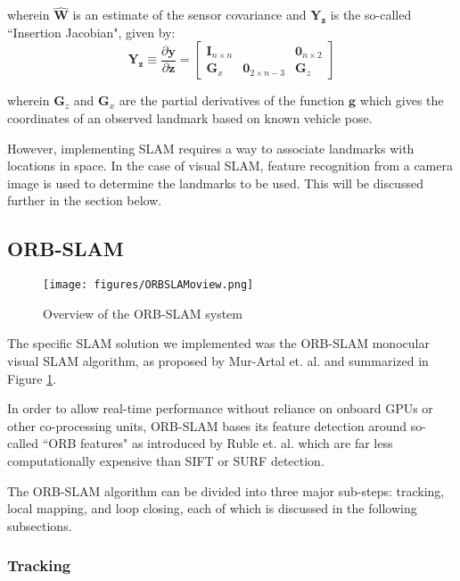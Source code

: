 wherein $\hat{\mathbf{W}}$ is an estimate of the sensor covariance and $\mathbf{Y_z}$ is the so-called ``Insertion Jacobian", given by: \begin{equation*}
    \mathbf{Y_z} \equiv \frac{\partial \mathbf{y}}{\partial \mathbf{z}} = \begin{bmatrix}
        \mathbf{I}_{n \times n} & & \mathbf{0}_{n\times 2} \\
        \mathbf{G}_x & \mathbf{0}_{2\times n-3} & \mathbf{G}_z
    \end{bmatrix}
\end{equation*}

wherein $\mathbf{G}_z$ and $\mathbf{G}_x$ are the partial derivatives of the function $\mathbf{g}$ which gives the coordinates of an observed landmark based on known vehicle pose.

However, implementing SLAM requires a way to associate landmarks with locations in space. In the case of visual SLAM, feature recognition from a camera image is used to determine the landmarks to be used. This will be discussed further in the section below.

\subsection{ORB-SLAM}

\begin{figure}[H]
    \centering
    \texttt{[image: figures/ORBSLAMoview.png]}
    \caption{Overview of the ORB-SLAM system \cite{ORBSLAM}}
    \label{fig:OSLAMOview}
\end{figure}

The specific SLAM solution we implemented was the ORB-SLAM monocular visual SLAM algorithm, as proposed by Mur-Artal et. al. \cite{ORBSLAM} and summarized in Figure \ref{fig:OSLAMOview}.

In order to allow real-time performance without reliance on onboard GPUs or other co-processing units, ORB-SLAM bases its feature detection around so-called ``ORB features" as introduced by Ruble et. al. \cite{ORB} which are far less computationally expensive than SIFT or SURF detection.

The ORB-SLAM algorithm can be divided into three major sub-steps: tracking, local mapping, and loop closing, each of which is discussed in the following subsections.

\subsubsection{Tracking}

